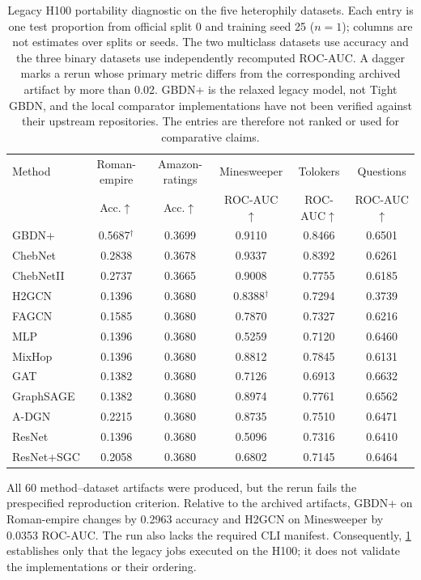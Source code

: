 \begin{table}[t]
\centering
\small
\setlength{\tabcolsep}{6.2pt}
\caption{Legacy H100 portability diagnostic on the five heterophily datasets.
Each entry is one test proportion from official split 0 and training seed 25
($n=1$); columns are not estimates over splits or seeds.  The two multiclass
datasets use accuracy and the three binary datasets use independently
recomputed ROC-AUC.  A dagger marks a rerun whose primary metric differs from
the corresponding archived artifact by more than 0.02.  GBDN+ is the relaxed
legacy model, not Tight GBDN, and the local comparator implementations have not
been verified against their upstream repositories.  The entries are therefore
not ranked or used for comparative claims.}
\label{tab:legacy-heterophily}
\begin{tabular}{lccccc}
\toprule
Method & Roman-empire & Amazon-ratings & Minesweeper & Tolokers & Questions \\
 & Acc.$\uparrow$ & Acc.$\uparrow$ & ROC-AUC$\uparrow$ & ROC-AUC$\uparrow$ & ROC-AUC$\uparrow$ \\
\midrule
GBDN+        & 0.5687$^{\dagger}$ & 0.3699 & 0.9110 & 0.8466 & 0.6501 \\
ChebNet      & 0.2838 & 0.3678 & 0.9337 & 0.8392 & 0.6261 \\
ChebNetII    & 0.2737 & 0.3665 & 0.9008 & 0.7755 & 0.6185 \\
H2GCN        & 0.1396 & 0.3680 & 0.8388$^{\dagger}$ & 0.7294 & 0.3739 \\
FAGCN        & 0.1585 & 0.3680 & 0.7870 & 0.7327 & 0.6216 \\
MLP          & 0.1396 & 0.3680 & 0.5259 & 0.7120 & 0.6460 \\
MixHop       & 0.1396 & 0.3680 & 0.8812 & 0.7845 & 0.6131 \\
GAT          & 0.1382 & 0.3680 & 0.7126 & 0.6913 & 0.6632 \\
GraphSAGE    & 0.1382 & 0.3680 & 0.8974 & 0.7761 & 0.6562 \\
A-DGN        & 0.2215 & 0.3680 & 0.8735 & 0.7510 & 0.6471 \\
ResNet       & 0.1396 & 0.3680 & 0.5096 & 0.7316 & 0.6410 \\
ResNet+SGC   & 0.2058 & 0.3680 & 0.6802 & 0.7145 & 0.6464 \\
\bottomrule
\end{tabular}
\end{table}

All 60 method--dataset artifacts were produced, but the rerun fails the
prespecified reproduction criterion.  Relative to the archived artifacts,
GBDN+ on Roman-empire changes by 0.2963 accuracy and H2GCN on Minesweeper by
0.0353 ROC-AUC.  The run also lacks the required CLI manifest.  Consequently,
\cref{tab:legacy-heterophily} establishes only that the legacy jobs executed
on the H100; it does not validate the implementations or their ordering.


